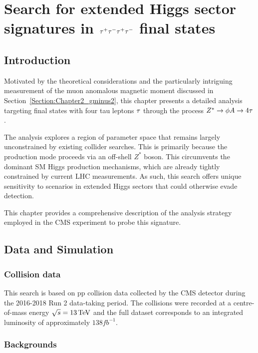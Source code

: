 \chapter{\texorpdfstring{Search for extended Higgs sector signatures in $\tau^+\tau^-\tau^+\tau^-$ final states}{Search for extended Higgs sector signatures in tautautautau final states}}
\thispagestyle{plain}  %
\pagestyle{chapterpages}
\label{Section:Chapter_4tau}
\minitoc

\section{Introduction}

Motivated by the theoretical considerations and the particularly intriguing measurement of the muon anomalous magnetic moment discussed in Section~\ref{Section:Chapter2_gminus2}, this chapter presents a detailed analysis targeting final states with four tau leptons $\tau$ through the process $Z^*\rightarrow\phi A\rightarrow4\tau$.

The analysis explores a region of parameter space that remains largely unconstrained by existing collider searches. This is primarily because the production mode proceeds via an off-shell $Z^*$ boson. This circumvents the dominant SM Higgs production mechanisms, which are already tightly constrained by current LHC measurements. As such, this search offers unique sensitivity to scenarios in extended Higgs sectors that could otherwise evade detection.

This chapter provides a comprehensive description of the analysis strategy employed in the CMS experiment to probe this signature. 
\section{Data and Simulation}
\subsection{Collision data}

This search is based on pp collision data collected by the CMS detector during the 2016-2018 Run 2 data-taking period. The collisions were recorded at a centre-of-mass energy $\sqrt{s} = 13\,\text{Te\hspace{-.08em}V}$ and the full dataset corresponds to an integrated luminosity of approximately $138\unit{fb}^{-1}$.

\subsection{Backgrounds}

